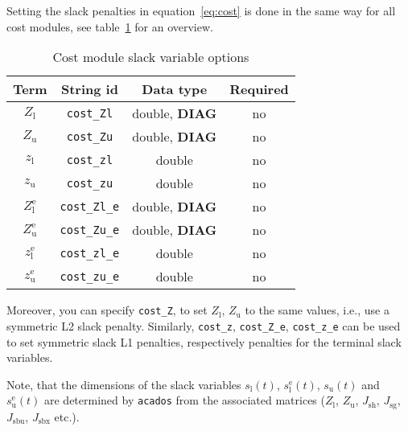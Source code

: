 \documentclass[
a4paper, %
10pt, %
notitlepage,
english]{CSUniSchoolLabReport}
\newcommand{\code}[1]{\texttt{#1}}
\newcommand{\acados}{\texttt{acados}}
\newcommand{\ind}[1]{_{\textrm{#1}}}
\newcommand{\terminal}{^{\textrm{e}}}
\newcommand{\Lower}{\ind{l}}
\newcommand{\upper}{\ind{u}}
\newcommand{\optional}{no}
\begin{document}
\begin{appendices}
Setting the slack penalties in equation~\eqref{eq:cost} is done in the same way for all cost modules, see table~\ref{tab:cost:slack} for an overview.
%
\begin{table}[h!]
	\centering
	\caption{Cost module slack variable options} \label{tab:cost:slack}
	\begin{tabular}{cccc}
		\toprule
		Term  & String id & Data type & Required \\ \midrule
		$ Z\Lower $          & \code{cost\_Zl}    & double, \textbf{DIAG}  & \optional \\
		$ Z\upper $          & \code{cost\_Zu}    & double, \textbf{DIAG}  & \optional   \\
		$ z\Lower $          & \code{cost\_zl}    & double  & \optional   \\
		$ z\upper $          & \code{cost\_zu}    & double  & \optional   \\ [1em]
		$ Z\Lower\terminal $ & \code{cost\_Zl\_e} & double, \textbf{DIAG} & \optional   \\
		$ Z\upper\terminal $ & \code{cost\_Zu\_e} & double, \textbf{DIAG} & \optional   \\
		$ z\Lower\terminal $ & \code{cost\_zl\_e} & double  & \optional   \\
		$ z\upper\terminal $ & \code{cost\_zu\_e} & double  & \optional   \\
		\bottomrule
	\end{tabular}
\end{table}
%
Moreover, you can specify \code{cost\_Z}, to set $ Z\Lower$, $Z\upper$ to the same values, i.e., use a symmetric L2 slack penalty.
Similarly, \code{cost\_z}, \code{cost\_Z\_e}, \code{cost\_z\_e} can be used to set symmetric slack L1 penalties, respectively penalties for the terminal slack variables.

Note, that the dimensions of the slack variables $s\Lower(t)$, $s\Lower\terminal(t)$, $s\upper(t)$ and $s\upper\terminal(t)$ are determined by \acados{} from the associated matrices ($Z\Lower$, $Z\upper$,  $J\ind{sh}$, $J\ind{sg}$, $J\ind{sbu}$, $J\ind{sbx}$ etc.).
%

\end{appendices}
\end{document}
